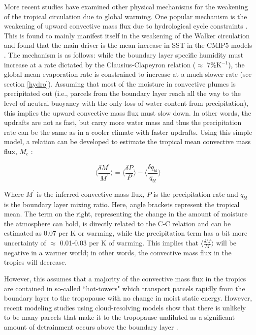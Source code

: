 \documentclass[letterpaper,12pt,titlepage,oneside,final]{book}
\begin{document}
More recent studies have examined other physical mechanisms for the weakening of the tropical circulation due to global warming. One popular mechanism is the weakening of upward convective mass flux due to hydrological cycle constraints \citep{held_robust_2006,vecchi_global_2007,chadwick_spatial_2012}. This is found to mainly manifest itself in the weakening of the Walker circulation \citep{held_robust_2006,vecchi_global_2007} and \citep{he_anthropogenic_2015} found that the main driver is the mean increase in SST in the CMIP5 models \citep{taylor_overview_2011}. The mechanism is as follows: while the boundary layer specific humidity must increase at a rate dictated by the Clausius-Clapeyron relation ($\approx$ 7\%K$^{-1}$), the global mean evaporation rate is constrained to increase at a much slower rate (see section \ref{hydro}). Assuming that most of the moisture in convective plumes is precipitated out (i.e., parcels from the boundary layer reach all the way to the level of neutral buoyancy with the only loss of water content from precipitation), this implies the upward convective mass flux must slow down. In other words, the updrafts are not as fast, but carry more water mass and thus the precipitation rate can be the same as in a cooler climate with faster updrafts. Using this simple model, a relation can be developed to estimate the tropical mean convective mass flux, 
$M_{c}$ \citep{held_robust_2006}:

\begin{equation}\label{eq:HS}
\Bigg\langle\frac{\delta{M^{'}}}{M^{'}}\Bigg\rangle=\Bigg\langle\frac{\delta{P}}{P}\Bigg\rangle-\Bigg\langle\frac{\delta{q_{bl}}}{q_{bl}}\Bigg\rangle
\end{equation}

Where $M^{'}$ is the inferred convective mass flux, $P$ is the precipitation rate and $q_{bl}$ is the boundary layer mixing ratio. Here, angle brackets represent the tropical mean. The term on the right, representing the change in the amount of moisture the atmosphere can hold, is directly related to the C-C relation and can be estimated as 0.07 per K or warming, while the precipitation term has a bit more uncertainty of $\approx$ 0.01-0.03 per K of warming. This implies that $\langle\frac{\delta{M}}{M}\rangle$ will be negative in a warmer world; in other words, the convective mass flux in the tropics will decrease. 

However, this assumes that a majority of the convective mass flux in the tropics are contained in so-called ``hot-towers" \citep{riehl_and_malkus_heat_1958} which transport parcels rapidly from the boundary layer to the tropopause with no change in moist static energy. However, recent modeling studies using cloud-resolving models show that there is unlikely to be many parcels that make it to the tropopause undiluted \citep{romps_undiluted_2010} as a significant amount of detrainment occurs above the boundary layer \citep{romps_direct_2010}. 
\end{document}
